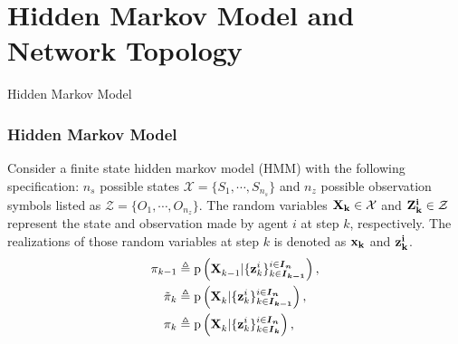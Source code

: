 \documentclass{beamer}
\newcommand{\vect}{\bf}
\theoremstyle{remark}
\newcommand{\XX}[3][2]{\mathbf{X}_{\tiny #2}^{\tiny #3}}
\newcommand{\pr}{\textrm{p}}
\newcommand{\bIn}{\boldsymbol{I}_{\boldsymbol{n}}}
\newcommand{\bIk}{\boldsymbol{I}_{\boldsymbol{k}}}
\newcommand{\bIkk}{\boldsymbol{I}_{\boldsymbol{k-1}}}
\newcommand{\zz}[3][2]{\mathbf{z}_{ #2}^{ #3}}
\begin{document}
\section{Hidden Markov Model and Network Topology}
\begin{frame}{Hidden Markov Model}
	
			\begin{exampleblock}{}
	\subsubsection*{Hidden Markov Model} Consider a finite state hidden markov model (HMM)   with the following specification:
	$n_s$ possible states {\color{red}$\mathcal{X} = \{S_1,\cdots,S_{n_s}\} $ }and  $n_z$ possible observation symbols listed as {\color{red} $\mathcal{Z} = \{O_1,\cdots,O_{n_z}\}$}.
	The random variables {\color{red}$\vect{X}_k \in \mathcal{X} $} and {\color{red}$ \vect{Z}_k^i \in \mathcal{Z} $} represent the state and observation made by agent $i$ at step $ k $, respectively. The realizations of those random variables at step $k$ is denoted as $\vect{x}_k$ and $\vect{z}_k^i$.    
		{\color{blue}
			\begin{align}
			\pi_{k-1}&\triangleq \pr\left(\XX[]{k-1}{}|\{\zz{k}{i}\}^{i\in\bIn}_{k\in\bIkk}\right),\nonumber\\
			\tilde{\pi}_{k}&\triangleq \pr\left(\XX[]{k}{}|\{\zz{k}{i}\}^{i\in\bIn}_{k\in\bIkk}{}\right),\nonumber\\
			\pi_{k}&\triangleq \pr\left(\XX[]{k}{}|\{\zz{k}{i}\}^{i\in\bIn}_{k\in\bIk}\right),\nonumber
			\end{align}}
		\end{exampleblock}
\end{frame}
\end{document}
